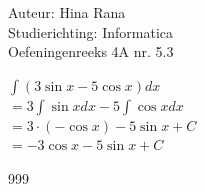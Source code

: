 \documentclass[a4paper]{article}
\newcommand{\dint}{\displaystyle\int}
\begin{document}
\noindent \large Auteur: Hina Rana \\
\noindent \large Studierichting: Informatica\\
\noindent \large Oefeningenreeks 4A nr. 5.3\\

\medskip

\normalsize

$ \dint (3\sin x  -  5\cos x) dx $\\

$ = 3 \dint\sin x dx - 5 \dint \cos x dx$ \\

$ = 3 \cdot (-\cos x) - 5 \sin x +C $\\

$ = -3 \cos x - 5 \sin x + C$


\begin{thebibliography}{999}
\end{thebibliography}
\end{document}
